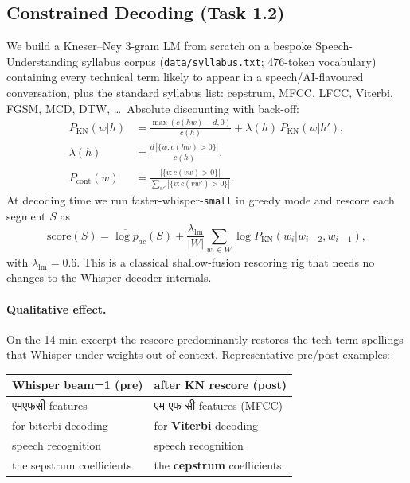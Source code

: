 \documentclass[conference]{IEEEtran}
\newcommand{\hin}[1]{{\hindifont #1}}
\begin{document}
\subsection{Constrained Decoding (Task 1.2)}
We build a Kneser--Ney 3-gram LM from scratch on a bespoke
Speech-Understanding syllabus corpus (\texttt{data/syllabus.txt}; 476-token
vocabulary) containing every technical term likely to appear in a
speech/AI-flavoured conversation, plus the standard syllabus list:
cepstrum, MFCC, LFCC, Viterbi, FGSM, MCD, DTW, \ldots\ Absolute discounting
with back-off:
\begin{align}
P_{\mathrm{KN}}(w|h) &= \frac{\max(c(hw)-d, 0)}{c(h)}
    + \lambda(h)\,P_{\mathrm{KN}}(w|h'),\\[-1pt]
\lambda(h) &= \frac{d\,|\{w : c(hw)>0\}|}{c(h)},\\[-1pt]
P_{\mathrm{cont}}(w) &= \frac{|\{v : c(vw)>0\}|}
  {\sum_{w'} |\{v : c(vw')>0\}|}.
\end{align}
At decoding time we run faster-whisper-\texttt{small} in greedy mode and
rescore each segment $S$ as
\[
\mathrm{score}(S) = \overline{\log p}_{ac}(S)
 + \frac{\lambda_{\mathrm{lm}}}{|W|}\sum_{w_{i}\in W}
    \log P_{\mathrm{KN}}(w_{i}|w_{i-2},w_{i-1}),
\]
with $\lambda_{\mathrm{lm}} = 0.6$. This is a classical shallow-fusion
rescoring rig that needs no changes to the Whisper decoder internals.

\paragraph*{Qualitative effect.} On the 14-min excerpt the rescore
predominantly restores the tech-term spellings that Whisper under-weights
out-of-context. Representative pre/post examples:

\begin{center}\scriptsize
\setlength{\tabcolsep}{3pt}
\begin{tabular}{@{}l l@{}}
\toprule
\textbf{Whisper beam=1 (pre)} & \textbf{after KN rescore (post)} \\
\midrule
\hin{एमएफसी} features              & \hin{एम एफ सी} features (MFCC) \\
for biterbi decoding               & for \textbf{Viterbi} decoding \\
speech recognition                 & speech recognition \\
the sepstrum coefficients          & the \textbf{cepstrum} coefficients \\
\bottomrule
\end{tabular}
\end{center}
\end{document}
